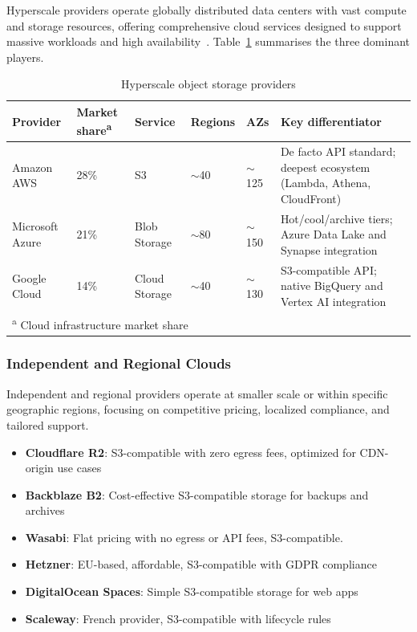 Hyperscale providers operate globally distributed data centers with vast compute and storage resources, offering comprehensive cloud services designed to support massive workloads and high availability~\cite{bmc-cloud-comparison}. Table~\ref{tab:hyperscale-comparison} summarises the three dominant players.

\begin{table}[H]
\centering
\caption{Hyperscale object storage providers}
\label{tab:hyperscale-comparison}
\footnotesize
\begin{tabular}{p{2.6cm}p{1.3cm}p{2.1cm}p{1.2cm}p{1.1cm}p{5.1cm}}
\hline
\textbf{Provider} & \textbf{Market share\textsuperscript{a}} & \textbf{Service} & \textbf{Regions} & \textbf{AZs} & \textbf{Key differentiator} \\
\hline
Amazon AWS      & 28\% & S3            & $\sim$40   & $\sim$125 & De facto API standard; deepest ecosystem (Lambda, Athena, CloudFront) \\
Microsoft Azure & 21\% & Blob Storage  & $\sim$80 & $\sim$150 & Hot/cool/archive tiers; Azure Data Lake and Synapse integration \\
Google Cloud    & 14\% & Cloud Storage & $\sim$40  & $\sim$130 & S3-compatible API; native BigQuery and Vertex AI integration \\
\hline
\multicolumn{6}{l}{\textsuperscript{a} Cloud infrastructure market share~\cite{statista-cloud-market-share}} \\
\end{tabular}
\end{table}

\subsubsection{Independent and Regional Clouds}

Independent and regional providers operate at smaller scale or within specific geographic regions, focusing on competitive pricing, localized compliance, and tailored support.

\begin{itemize}
    \item \textbf{Cloudflare R2}: S3-compatible with zero egress fees, optimized for CDN-origin use cases
    \item \textbf{Backblaze B2}: Cost-effective S3-compatible storage for backups and archives
    \item \textbf{Wasabi}: Flat pricing with no egress or API fees, S3-compatible.
    \item \textbf{Hetzner}: EU-based, affordable, S3-compatible with GDPR compliance
    \item \textbf{DigitalOcean Spaces}: Simple S3-compatible storage for web apps
    \item \textbf{Scaleway}: French provider, S3-compatible with lifecycle rules
\end{itemize}

